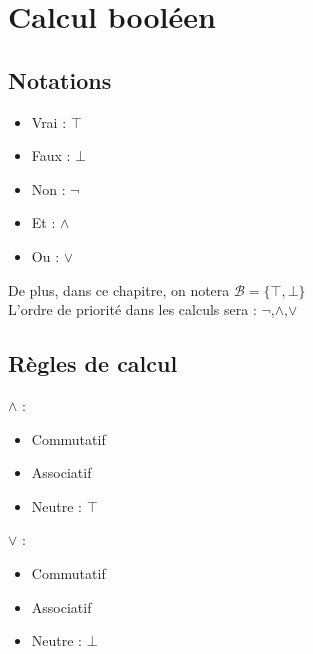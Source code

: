 \newtheorem{rmq}{Remarque}
\newtheorem{defi}{Définition}

\maketitle

\section{Calcul booléen}

\subsection{Notations}

\begin{itemize}
    \item Vrai : $\top$
    \item Faux : $\bot$
    \item Non : $\lnot$
    \item Et : $\land$
    \item Ou : $\lor$
\end{itemize}

De plus, dans ce chapitre, on notera $\mathcal{B}=\{\top,\bot\}$ \\
L'ordre de priorité dans les calculs sera : $\lnot$,$\land$,$\lor$ \\

\subsection{Règles de calcul}

\begin{prop}
    $\land$ :
    \begin{itemize}
        \item Commutatif
        \item Associatif
        \item Neutre : $\top$
    \end{itemize}
\end{prop}

\begin{prop}
    $\lor$ :
    \begin{itemize}
        \item Commutatif
        \item Associatif
        \item Neutre : $\bot$
    \end{itemize}
\end{prop}


